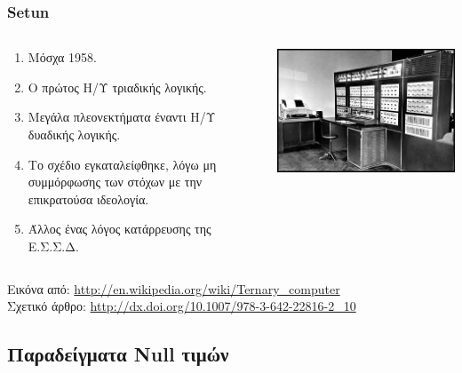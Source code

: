 \begin{frame}[t, fragile]
\frametitle{\en Setun}
  \begin{columns}[T]
    \begin{column}{0.6\textwidth}
        \begin{enumerate}
          \item Μόσχα 1958.
          \item Ο πρώτος Η/Υ τριαδικής λογικής. 
          \item Μεγάλα πλεονεκτήματα έναντι Η/Υ δυαδικής λογικής.
          \item Το σχέδιο εγκαταλείφθηκε, λόγω μη συμμόρφωσης των στόχων με την επικρατούσα ιδεολογία.                 
          \item Άλλος ένας λόγος κατάρρευσης της Ε.Σ.Σ.Δ. 
        \end{enumerate}
    \end{column}
    \begin{column}{0.4\textwidth}
      \includegraphics[scale=0.75]{setun.jpg}
    \end{column}
  \end{columns}
  \bigskip
\tiny Εικόνα από: {\en \url{http://en.wikipedia.org/wiki/Ternary_computer} }  \\
      Σχετικό άρθρο: {\en\url{http://dx.doi.org/10.1007/978-3-642-22816-2_10}}
\end{frame}



\subsection[\textlatin{Examples}] {\textgreek {Παραδείγματα} \textlatin{Null} τιμών}


